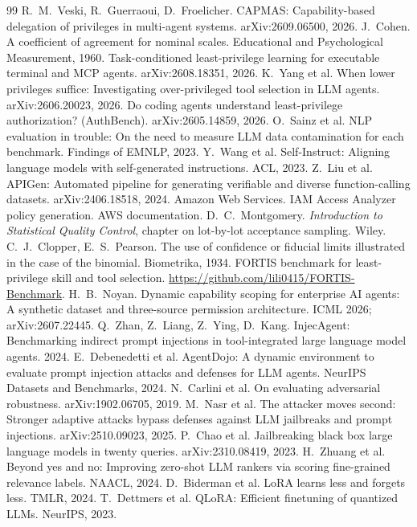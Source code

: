 \documentclass[10pt]{article}
\begin{document}
\begin{thebibliography}{99}\small
{} R.~M.~Veski, R.~Guerraoui, D.~Froelicher. CAPMAS: Capability-based delegation of privileges in multi-agent systems. arXiv:2609.06500, 2026.
 J.~Cohen. A coefficient of agreement for nominal scales. Educational and Psychological Measurement, 1960.
 Task-conditioned least-privilege learning for executable terminal and MCP agents. arXiv:2608.18351, 2026.
 K.~Yang et al. When lower privileges suffice: Investigating over-privileged tool selection in LLM agents. arXiv:2606.20023, 2026.
 Do coding agents understand least-privilege authorization? (AuthBench). arXiv:2605.14859, 2026.
 O.~Sainz et al. NLP evaluation in trouble: On the need to measure LLM data contamination for each benchmark. Findings of EMNLP, 2023.
 Y.~Wang et al. Self-Instruct: Aligning language models with self-generated instructions. ACL, 2023.
 Z.~Liu et al. APIGen: Automated pipeline for generating verifiable and diverse function-calling datasets. arXiv:2406.18518, 2024.
 Amazon Web Services. IAM Access Analyzer policy generation. AWS documentation.
 D.~C.~Montgomery. \emph{Introduction to Statistical Quality Control}, chapter on lot-by-lot acceptance sampling. Wiley.
 C.~J.~Clopper, E.~S.~Pearson. The use of confidence or fiducial limits illustrated in the case of the binomial. Biometrika, 1934.
 FORTIS benchmark for least-privilege skill and tool selection. \url{https://github.com/lili0415/FORTIS-Benchmark}.
 H.~B.~Noyan. Dynamic capability scoping for enterprise AI agents: A synthetic dataset and three-source permission architecture. ICML 2026; arXiv:2607.22445.
 Q.~Zhan, Z.~Liang, Z.~Ying, D.~Kang. InjecAgent: Benchmarking indirect prompt injections in tool-integrated large language model agents. 2024.
 E.~Debenedetti et al. AgentDojo: A dynamic environment to evaluate prompt injection attacks and defenses for LLM agents. NeurIPS Datasets and Benchmarks, 2024.
 N.~Carlini et al. On evaluating adversarial robustness. arXiv:1902.06705, 2019.
 M.~Nasr et al. The attacker moves second: Stronger adaptive attacks bypass defenses against LLM jailbreaks and prompt injections. arXiv:2510.09023, 2025.
 P.~Chao et al. Jailbreaking black box large language models in twenty queries. arXiv:2310.08419, 2023.
 H.~Zhuang et al. Beyond yes and no: Improving zero-shot LLM rankers via scoring fine-grained relevance labels. NAACL, 2024.
 D.~Biderman et al. LoRA learns less and forgets less. TMLR, 2024.
 T.~Dettmers et al. QLoRA: Efficient finetuning of quantized LLMs. NeurIPS, 2023.
\end{thebibliography}
\end{document}
